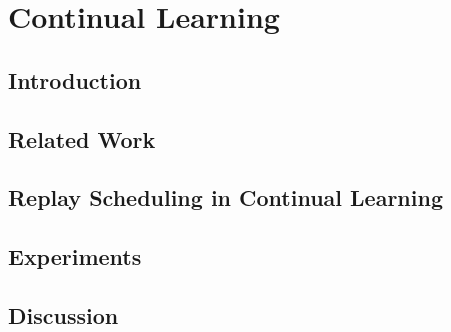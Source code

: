 
\chapter{Continual Learning}

\section{Introduction}
\section{Related Work}
\section{Replay Scheduling in Continual Learning} %
\section{Experiments}
\section{Discussion}



